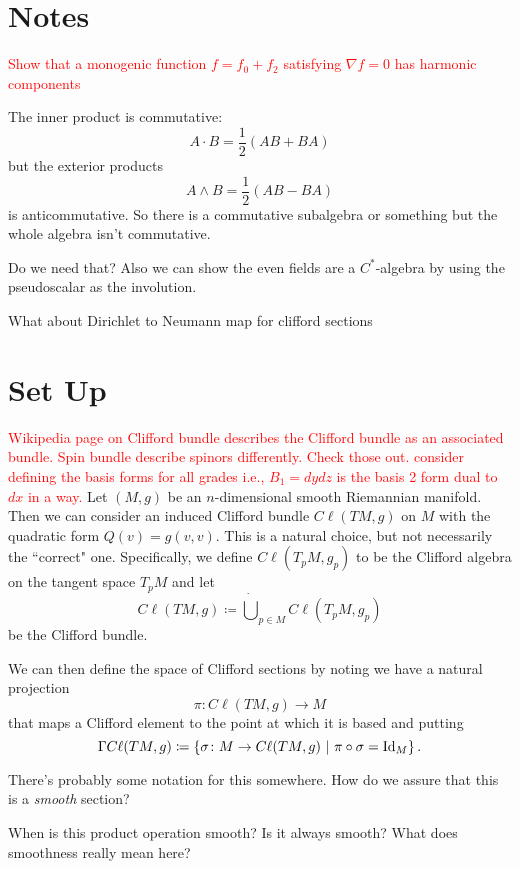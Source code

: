 \section{Notes}

\textcolor{red}{Show that a monogenic function $f=f_0 + f_2$ satisfying $\nabla f=0$ has harmonic components}

The inner product is commutative:
\[
A\cdot B = \frac{1}{2}(AB+BA)
\]
but the exterior products
\[
A\wedge B = \frac{1}{2}(AB-BA)
\]
is anticommutative. So there is a commutative subalgebra or something but the whole algebra isn't commutative.

Do we need that? Also we can show the even fields are a $C^*$-algebra by using the pseudoscalar as the involution.

What about Dirichlet to Neumann map for clifford sections

\section{Set Up}
\textcolor{red}{Wikipedia page on Clifford bundle describes the Clifford bundle as an associated bundle. Spin bundle describe spinors differently. Check those out.}
\textcolor{red}{consider defining the basis forms for all grades i.e., $B_1 = dydz$ is the basis 2 form dual to $dx$ in a way.}
Let $(M,g)$ be an $n$-dimensional smooth Riemannian manifold.  Then we can consider an induced Clifford bundle $C\ell(TM,g)$ on $M$ with the quadratic form $Q(v)=g(v,v)$.  This is a natural choice, but not necessarily the ``correct" one.  Specifically, we define $C\ell(T_pM,g_p)$ to be the Clifford algebra on the tangent space $T_pM$ and let
\[
C\ell(TM,g) \coloneqq \dot{\bigcup}_{p\in M} C\ell (T_pM,g_p)
\]
be the Clifford bundle.

We can then define the space of Clifford sections by noting we have a natural projection
\[
\pi \colon C\ell(TM,g) \to M
\]
that maps a Clifford element to the point at which it is based and putting
\[
\Gamma C \ell (TM,g) \coloneqq \left\{ \sigma \colon M \to C\ell(TM,g) ~\vert~ \pi \circ \sigma = \mathrm{Id}_M\right\}.
\]
\begin{question}
There's probably some notation for this somewhere. How do we assure that this is a \emph{smooth} section?
\end{question}

\begin{question}
When is this product operation smooth? Is it always smooth? What does smoothness really mean here?
\end{question}


